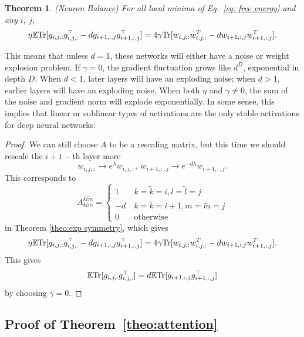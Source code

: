 \documentclass{article}
\theoremstyle{plain}
\newtheorem{theorem}{Theorem}
\newcommand{\Tr}{{\rm Tr}}
\begin{document}
\begin{theorem}\label{theo: polynomial net balance}
(Neuron Balance) For all local minima of 
Eq.~\eqref{eq: free energy} and any $i,\ j$, 
\begin{equation}
\eta\mathbb{E}\Tr[g_{i,j,:}g_{i,j,:}^\top-dg_{i+1,:, j}g_{i+1,:,j}^\top]=4\gamma\Tr[w_{i,j,:}w_{i,j,:}^T-dw_{i+1,:,j}w_{i+1,:,j}^T].
\end{equation}
\end{theorem}

This means that unless $d=1$, these networks will either have a noise or weight explosion problem. If $\gamma=0$, the gradient fluctuation grows like $d^D$, exponential in depth $D$. When $d<1$, later layers will have an exploding noise; when $d>1$, earlier layers will have an exploding noise. When both $\eta$ and $\gamma \neq 0$, the sum of the noise and gradient norm will explode exponentially. In some sense, this implies that linear or sublinear types of activations are the only stable activations for deep neural networks.

\begin{proof}
We can still choose $A$ to be a rescaling matrix, but this time we should rescale the $i+1-$th layer more
   \begin{equation}
        w_{i,j,:} \to e^{\lambda}w_{i,j,:},\ w_{i+1,:,j} \to e^{-d\lambda}w_{i+1,:,j}.
    \end{equation}
This corresponds to    
\begin{equation}
        A_{klm}^{\tilde{k}\tilde{l}\tilde{m}}=\begin{cases}
1 & \ k=\tilde{k}=i,l=\tilde{l}=j \\
-d & \ k=\tilde{k}=i+1,m=\tilde{m}=j\\
0&\ \text{otherwise}
\end{cases}
    \end{equation} in Theorem \ref{theo:exp symmetry}, which gives
\begin{equation}
\eta\mathbb{E}\Tr[g_{i,j,:}g_{i,j,:}^\top-dg_{i+1,:, j}g_{i+1,:,j}^\top]=4\gamma\Tr[w_{i,j,:}w_{i,j,:}^T-dw_{i+1,:,j}w_{i+1,:,j}^T].
\end{equation}
This gives
\begin{equation}
 \mathbb{E}\Tr[g_{i,j,:}g_{i,j,:}^\top] = d\mathbb{E}\Tr[g_{i+1,:, j}g_{i+1,:,j}^\top]
\end{equation} by choosing $\gamma=0$.
\end{proof}


\subsection{Proof of Theorem~\ref{theo:attention}}
\end{document}
